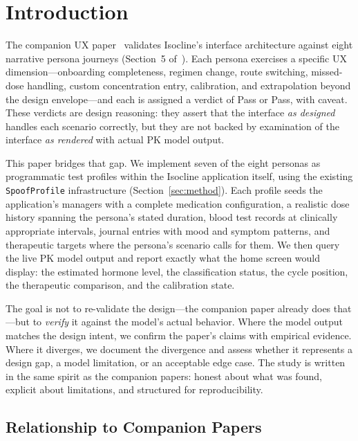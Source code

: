 \documentclass[11pt,a4paper]{article}
\newcommand{\good}[1]{#1}
\newcommand{\code}[1]{\texttt{\small #1}}
\begin{document}
\tableofcontents
\clearpage

\section{Introduction}
\label{sec:intro}

The companion UX paper~\cite{xtux} validates Isocline's interface architecture
against eight narrative persona journeys (Section~5 of~\cite{xtux}). Each
persona exercises a specific UX dimension---onboarding completeness, regimen
change, route switching, missed-dose handling, custom concentration entry,
calibration, and extrapolation beyond the design envelope---and each is
assigned a verdict of \good{Pass} or \good{Pass, with caveat.} These
verdicts are design reasoning: they assert that the interface \emph{as
designed} handles each scenario correctly, but they are not backed by
examination of the interface \emph{as rendered} with actual PK model output.

This paper bridges that gap. We implement seven of the eight personas as
programmatic test profiles within the Isocline application itself, using the
existing \code{SpoofProfile} infrastructure (Section~\ref{sec:method}).
Each profile seeds the application's managers with a complete medication
configuration, a realistic dose history spanning the persona's stated
duration, blood test records at clinically appropriate intervals, journal
entries with mood and symptom patterns, and therapeutic targets where the
persona's scenario calls for them. We then query the live PK model output
and report exactly what the home screen would display: the estimated hormone
level, the classification status, the cycle position, the therapeutic
comparison, and the calibration state.

The goal is not to re-validate the design---the companion paper already does
that---but to \emph{verify} it against the model's actual behavior. Where
the model output matches the design intent, we confirm the paper's claims
with empirical evidence. Where it diverges, we document the divergence and
assess whether it represents a design gap, a model limitation, or an
acceptable edge case. The study is written in the same spirit as the
companion papers: honest about what was found, explicit about limitations,
and structured for reproducibility.

\subsection{Relationship to Companion Papers}
\end{document}
